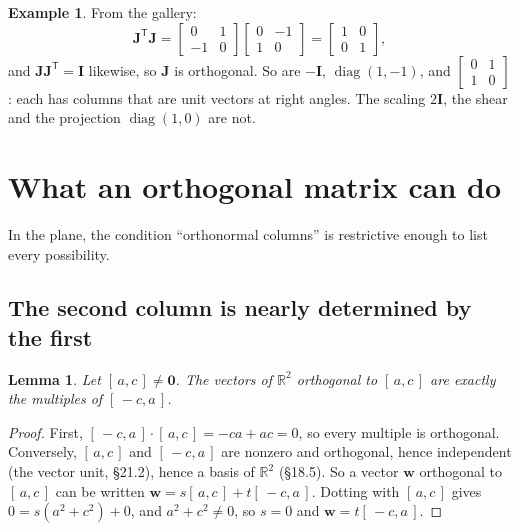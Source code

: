 \documentclass[11pt]{article}
\theoremstyle{plain}
\newtheorem{lem}[thm]{Lemma}
\theoremstyle{definition}
\newtheorem{ex}{Example}[section]
\theoremstyle{remark}
\newcommand{\R}{\mathbb{R}}
\newcommand{\vc}[1]{\mathbf{#1}}
\newcommand{\mt}[1]{\mathbf{#1}}
\newcommand{\T}{^{\mathsf{T}}}
\DeclareMathOperator{\diagop}{diag}
\begin{document}
\begin{ex}
From the gallery:
\[
  \mt{J}\T\mt{J}
  =\begin{bmatrix}0&1\\-1&0\end{bmatrix}\begin{bmatrix}0&-1\\1&0\end{bmatrix}
  =\begin{bmatrix}1&0\\0&1\end{bmatrix},
\]
and $\mt{J}\mt{J}\T=\mt{I}$ likewise, so $\mt{J}$ is orthogonal. So are
$-\mt{I}$, $\diagop(1,-1)$, and $\begin{bmatrix}0&1\\1&0\end{bmatrix}$: each has
columns that are unit vectors at right angles. The scaling $2\mt{I}$, the shear
and the projection $\diagop(1,0)$ are not.
\end{ex}

\section{What an orthogonal matrix can do}
In the plane, the condition ``orthonormal columns'' is restrictive enough to
list every possibility.

\subsection{The second column is nearly determined by the first}
\begin{lem}
\label{lem:perp}
Let $[\,a,c\,]\neq\vc{0}$. The vectors of $\R^{2}$ orthogonal to $[\,a,c\,]$
are exactly the multiples of $[\,-c,a\,]$.
\end{lem}

\begin{proof}
First, $[\,-c,a\,]\cdot[\,a,c\,]=-ca+ac=0$, so every multiple is orthogonal.
Conversely, $[\,a,c\,]$ and $[\,-c,a\,]$ are nonzero and orthogonal, hence
independent (the vector unit, \S21.2), hence a basis of $\R^{2}$ (\S18.5). So a
vector $\vc{w}$ orthogonal to $[\,a,c\,]$ can be written
$\vc{w}=s[\,a,c\,]+t[\,-c,a\,]$. Dotting with $[\,a,c\,]$ gives
$0=s(a^{2}+c^{2})+0$, and $a^{2}+c^{2}\neq0$, so $s=0$ and $\vc{w}=t[\,-c,a\,]$.
\end{proof}
\end{document}

